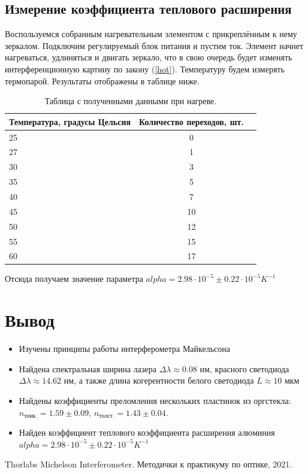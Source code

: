 \documentclass[a4paper, 12pt]{article}
\begin{document}
	\subsection*{Измерение коэффициента теплового расширения}
	Воспользуемся собранным нагревательным элементом с прикреплённым к нему зеркалом. Подключим регулируемый блок питания и пустим ток. Элемент начнет нагреваться, удлиняться и двигать зеркало, что в свою очередь будет изменять интерференционную картину по закону (\ref{hot}). Температуру будем измерять термопарой. Результаты отображены в таблице ниже.
	\begin{table}[H]
		\centering
		\caption{Таблица с полученными данными при нагреве.}
		\begin{tabular}[t]{lcc}
			\hline
			Температура, градусы Цельсия&Количество переходов, шт.\\
			\hline
			25&0\\
			27&1\\
			30&3\\
			35&5\\
			40&7\\
			45&10\\
			50&12\\
			55&15\\
			60&17\\
			\hline
		\end{tabular}
	\end{table}
	Отсюда получаем значение параметра $alpha = 2.98 \cdot 10^{-5} \pm 0.22 \cdot 10^{-5} K^{-1}$ 
	\section*{Вывод}
	\begin{itemize}
			\item Изучены принципы работы интерферометра Майкельсона
			\item Найдена спектральная ширина лазера $\Delta \lambda \approx 0.08$ нм, красного светодиода $\Delta \lambda \approx 14.62$ нм, а также длина когерентности белого светодиода $L \approx 10$ мкм
			\item Найдены коэффициенты преломления нескольких пластинок из оргстекла: $n_{\text{тонк.}} = 1.59 \pm 0.09$, $n_{\text{толст.}} = 1.43 \pm 0.04$.
			\item Найден коэффициент теплового коэффициента расширения алюминия $alpha = 2.98 \cdot 10^{-5} \pm 0.22 \cdot 10^{-5} K^{-1}$ 
	\end{itemize}

	\begin{thebibliography}{9}
		Thorlabs Michelson Interferometer.
		Методички к практикуму по оптике, 2021.
	\end{thebibliography}
\end{document}
